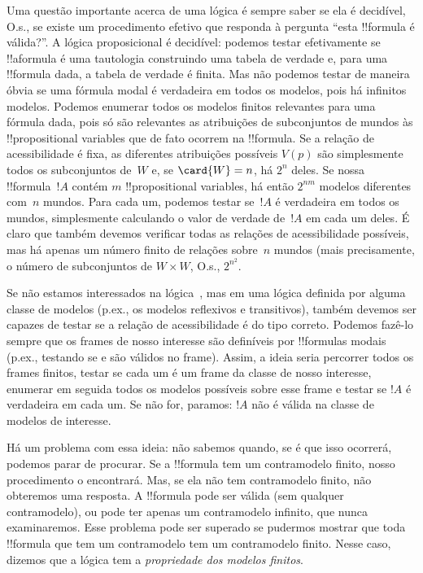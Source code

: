 \documentclass[../../../include/open-logic-section]{subfiles}
\begin{document}


Uma questão importante acerca de uma lógica é sempre saber se ela é
decidível, O.s.\@, se existe um procedimento efetivo que responda à
pergunta ``esta !!{formula} é válida?''. A lógica proposicional é
decidível: podemos testar efetivamente se !!a{formula} é uma tautologia
construindo uma tabela de verdade e, para uma !!{formula} dada, a
tabela de verdade é finita. Mas não podemos testar de maneira óbvia se
uma fórmula modal é verdadeira em todos os modelos, pois há
infinitos modelos. Podemos enumerar todos os modelos finitos relevantes
para uma fórmula dada, pois só são relevantes as atribuições de
subconjuntos de mundos às !!{propositional variable}s que de fato
ocorrem na !!{formula}. Se a relação de acessibilidade é fixa, as
diferentes atribuições possíveis $V(p)$ são simplesmente todos os
subconjuntos de~$W$ e, se $\card{W} = n$, há $2^n$ deles. Se nossa
!!{formula}~$!A$ contém $m$ !!{propositional
  variable}s, há então $2^{nm}$ modelos diferentes com~$n$ mundos.
Para cada um, podemos testar se~$!A$ é verdadeira em todos os mundos,
simplesmente calculando o valor de verdade de~$!A$ em cada um deles. É
claro que também devemos verificar todas as relações de acessibilidade
possíveis, mas há apenas um número finito de relações sobre~$n$ mundos
(mais precisamente, o número de subconjuntos de $W \times W$, O.s.\@,
$2^{n^2}$.

Se não estamos interessados na lógica~, mas em uma lógica
definida por alguma classe de modelos (p.ex., os modelos
reflexivos e transitivos), também devemos ser capazes de testar se a
relação de acessibilidade é do tipo correto. Podemos fazê-lo sempre que
os frames de nosso interesse são definíveis por !!{formula}s modais
(p.ex., testando se  e  são válidos no frame). Assim,
a ideia seria percorrer todos os frames finitos, testar se cada um é um
frame da classe de nosso interesse, enumerar em seguida todos os
modelos possíveis sobre esse frame e testar se $!A$ é verdadeira em
cada um. Se não for, paramos: $!A$ não é válida na classe de modelos
de interesse.

Há um problema com essa ideia: não sabemos quando, se é que isso
ocorrerá, podemos parar de procurar. Se a !!{formula} tem um
contramodelo finito, nosso procedimento o encontrará. Mas, se ela não
tem contramodelo finito, não obteremos uma resposta. A !!{formula} pode
ser válida (sem qualquer contramodelo), ou pode ter apenas um
contramodelo infinito, que nunca examinaremos. Esse problema pode ser
superado se pudermos mostrar que toda !!{formula} que tem um
contramodelo tem um contramodelo finito. Nesse caso, dizemos que a
lógica tem a \emph{propriedade dos modelos finitos}.
\end{document}
